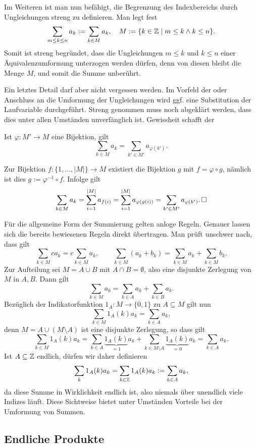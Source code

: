 \noindent
Im Weiteren ist man nun befähigt, die Begrenzung des Indexbereichs
durch Ungleichungen streng zu definieren. Man legt fest
\[\sum_{m\le k\le n} a_k := \sum_{k\in M} a_k,
\quad M := \{k\in\mathbb Z\mid m\le k\land k\le n\}.\]
Somit ist streng begründet, dass die Ungleichungen $m\le k$
und $k\le n$ einer Äquivalenzumformung unterzogen werden dürfen,
denn von diesen bleibt die Menge $M$, und somit die Summe unberührt.

Ein letztes Detail darf aber nicht vergessen werden. Im Vorfeld der
oder Anschluss an die Umformung der Ungleichungen wird ggf. eine
Substitution der Laufvariable durchgeführt. Streng genommen muss noch
abgeklärt werden, dass dies unter allen Umständen unverfänglich ist.
Gewissheit schafft der

\begin{Satz}[Substitutionsregel]
Ist $\varphi\colon M'\to M$ eine Bijektion, gilt
\[\sum_{k\in M} a_k = \sum_{k'\in M'} a_{\varphi(k')}.\]
\end{Satz}
\begin{Beweis}
Zur Bijektion $f\colon\{1,\ldots,|M|\}\to M$ existiert die Bijektion
$g$ mit $f = \varphi\circ g$, nämlich ist dies $g:=\varphi^{-1}\circ f$.
Infolge gilt
\[\sum_{k\in M} a_k = \sum_{i=1}^{|M|} a_{f(i)}
= \sum_{i=1}^{|M|} a_{\varphi(g(i))}
= \sum_{k'\in M'} a_{\varphi(k')}.\,\Box\]
\end{Beweis}
Für die allgemeine Form der Summierung gelten anloge Regeln. Genauer
lassen sich die bereits bewiesenen Regeln direkt übertragen.
Man prüft unschwer nach, dass gilt
\[\sum_{k\in M} ca_k = c\sum_{k\in M}a_k,\qquad\sum_{k\in M} (a_k+b_k)
= \sum_{k\in M} a_k + \sum_{k\in M} b_k.\]
Zur Aufteilung sei $M = A\cup B$ mit $A\cap B = \emptyset$, also
eine disjunkte Zerlegung von $M$ in $A,B$. Dann gilt
\[\sum_{k\in M} a_k = \sum_{k\in A} a_k + \sum_{k\in B} a_k.\]
Bezüglich der Indikatorfunktion $1_A\colon M\to\{0,1\}$
zu $A\subseteq M$ gilt nun
\[\sum_{k\in M} 1_A(k)a_k = \sum_{k\in A} a_k,\]
denn $M=A\cup (M\setminus A)$ ist eine disjunkte Zerlegung, so dass gilt
\[\sum_{k\in M} 1_A(k)a_k = \sum_{k\in A} \underbrace{1_A(k)}_{=1}a_k
+ \sum_{k\in M\setminus A} \underbrace{1_A(k)}_{=0}a_k
= \sum_{k\in A} a_k.\]
Ist $A\subseteq\mathbb Z$ endlich, dürfen wir daher definieren
\[\sum_k 1_A(k)a_k = \sum_{k\in\mathbb Z} 1_A(k)a_k := \sum_{k\in A} a_k,\]
da diese Summe in Wirklichkeit endlich ist, also niemals über
unendlich viele Indizes läuft. Diese Sichtweise bietet unter Umständen
Vorteile bei der Umformung von Summen.

\subsection{Endliche Produkte}

